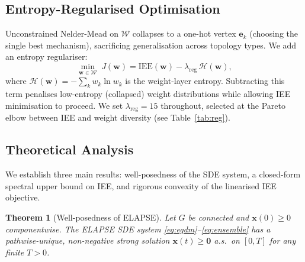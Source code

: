 \documentclass[review,12pt]{elsarticle}
\newcommand{\bfx}{\mathbf{x}}
\newcommand{\bfw}{\mathbf{w}}
\newcommand{\IEE}{\mathrm{IEE}}
\newtheorem{theorem}{Theorem}
\begin{document}
\subsection{Entropy-Regularised Optimisation}

Unconstrained Nelder-Mead on $\mathcal{W}$ collapses to a one-hot vertex
$\mathbf{e}_k$ (choosing the single best mechanism), sacrificing
generalisation across topology types. We add an entropy regulariser:
\begin{equation}
  \min_{\bfw \in \mathcal{W}}\; J(\bfw)
    = \IEE(\bfw) - \lambda_{\mathrm{reg}}\,\mathcal{H}(\bfw),
  \label{eq:objective}
\end{equation}
where $\mathcal{H}(\bfw) = -\sum_k w_k \ln w_k$ is the weight-layer
entropy. Subtracting this term penalises low-entropy (collapsed) weight
distributions while allowing IEE minimisation to proceed. We set
$\lambda_{\mathrm{reg}} = 15$ throughout, selected at the Pareto elbow
between IEE and weight diversity (see Table~\ref{tab:reg}).

\subsection{Theoretical Analysis}
\label{sec:theory}

We establish three main results: well-posedness of the SDE system, a
closed-form spectral upper bound on IEE, and rigorous convexity of the
linearised IEE objective.

\begin{theorem}[Well-posedness of ELAPSE]
\label{thm:wellposed}
Let $G$ be connected and $\bfx(0) \geq 0$ componentwise.
The ELAPSE SDE system \eqref{eq:egdm}--\eqref{eq:ensemble} has a
pathwise-unique, non-negative strong solution $\bfx(t) \geq \mathbf{0}$
a.s.\ on $[0,T]$ for any finite $T > 0$.
\end{theorem}
\end{document}
